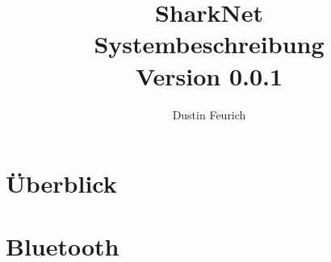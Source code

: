 \documentclass[german]{book}
\begin{document}
	
	

\title{SharkNet\\
Systembeschreibung \\
Version 0.0.1
}

\author{
Dustin Feurich
}

\maketitle

\tableofcontents

\chapter{Überblick}


\chapter{Bluetooth}

\end{document}
